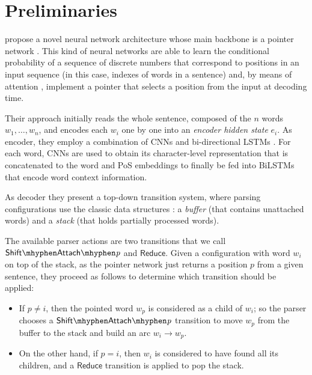 \documentclass[11pt,a4paper]{article}
\newcommand{\transname}[1]{\ensuremath{\mathsf{#1}}}
\newcommand{\sh}{\transname{Shift\mhyphen Attach\mhyphen \textit{p}}}
\newcommand{\re}{\transname{Reduce}}
\begin{document}
\section{Preliminaries}
\citet{Ma18} propose a novel neural network architecture whose main backbone is a pointer network \cite{Vinyals15}. This kind of neural networks are able to learn the conditional probability of a sequence of discrete numbers that correspond to positions in an input sequence (in this case, indexes of words in a sentence) and, by means of attention \cite{Bahdanau2014, Luong2015}, implement a pointer that selects a position from the input at decoding time.

Their approach initially reads the whole sentence, composed of the $n$ words $w_1, \dots ,w_n$, and encodes each $w_i$ 
one by one into an \textit{encoder hidden state} $e_i$.
As encoder, they employ a combination of CNNs and bi-directional LSTMs \cite{Chiu2016, Ma2016}. For each word, CNNs are used to obtain its character-level representation that is concatenated to the word and PoS embeddings to finally be fed into BiLSTMs that encode word context information.

As decoder they present a top-down transition system, where parsing configurations 
use the classic data structures \cite{nivre08cl}: a \textit{buffer} (that contains unattached words) and a \textit{stack} (that holds partially processed words). 

The available parser actions are
two transitions that we call $\sh$ and $\re$. Given a configuration with word $w_i$ on top of the stack, as the pointer network just returns a position $p$ from a given sentence, they proceed as follows to determine which transition should be applied: 
\begin{itemize}
    \item If $p \neq i$,
    then the pointed word $w_p$ is considered as a child of $w_i$; so the parser chooses a $\sh$ transition to move $w_p$ from the buffer to the stack and build an arc $w_i \rightarrow w_p$.
    \item On the other hand,  
    if $p = i$,
    then 
    $w_i$ is considered to have found all its children, and
    a $\re$ transition is applied to pop the stack.
\end{itemize}
\end{document}
